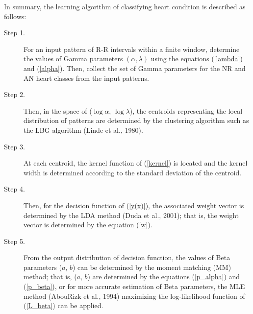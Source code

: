 \documentclass[times,twocolumn,final,authoryear]{elsarticle}
\begin{document}
In summary, the learning algorithm of classifying heart condition is described as follows:
\begin{description}
\item[Step 1.] For an input pattern of R-R intervals within a finite window, determine the values of
  Gamma parameters $(\alpha, \lambda)$ using the equations (\ref{lambda}) and (\ref{alpha}). Then, collect the set of Gamma parameters for
  the NR and AN heart classes from the input patterns.
\item[Step 2.] Then, in the space of ($\log \alpha$, $\log \lambda$), the centroids representing the local distribution of
  patterns are determined by the clustering algorithm such as the LBG algorithm (Linde et al., 1980).
\item[Step 3.] At each centroid, the kernel function of (\ref{kernel}) is located and the kernel width is determined
  according to the standard deviation of the centroid.
\item[Step 4.] Then, for the decision function of (\ref{y(x)}), the associated weight vector is determined by the LDA method 
  (Duda et al., 2001); that is, the weight vector is determined by the equation (\ref{w}).
\item[Step 5.] From the output distribution of decision function, the values of Beta parameters ($a$, $b$) can be determined by the moment
  matching (MM) method; that is, ($a$, $b$) are determined by the equations (\ref{p_alpha}) and (\ref{p_beta}), or for more accurate estimation of
Beta parameters, the MLE method (AbouRizk et al., 1994) maximizing the log-likelihood function of (\ref{L_beta}) can be applied.
\end{description}
\end{document}
